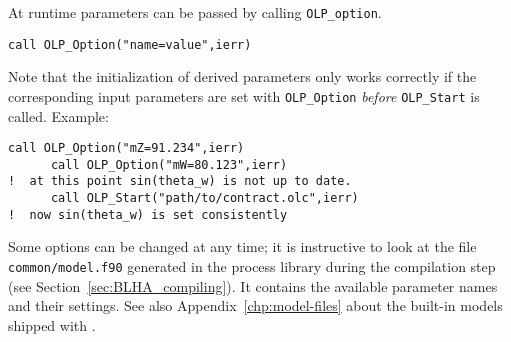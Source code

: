 At runtime parameters can be passed by calling \texttt{OLP\_option}.
\begin{lstlisting}[style=fortran]
      call OLP_Option("name=value",ierr)
\end{lstlisting}
Note that the initialization of derived parameters only works correctly if the corresponding input parameters are set with \texttt{OLP\_Option}
\emph{before} \texttt{OLP\_Start} is called. Example:
\begin{lstlisting}[style=fortran]
      call OLP_Option("mZ=91.234",ierr)
      call OLP_Option("mW=80.123",ierr)
!  at this point sin(theta_w) is not up to date.
      call OLP_Start("path/to/contract.olc",ierr)
!  now sin(theta_w) is set consistently
\end{lstlisting}
Some options can be changed at any time; it is instructive to look at the file \texttt{common/model.f90} generated in the process library during the compilation step (see Section~\ref{sec:BLHA_compiling}). It contains  the available parameter names and their settings. See also Appendix~\ref{chp:model-files} about the built-in models shipped with \gosam.



